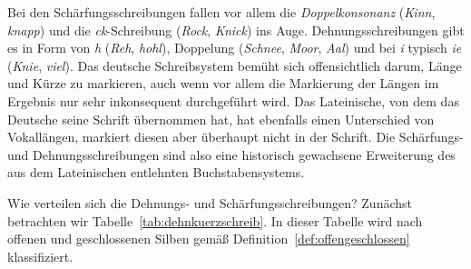 

Bei den Schärfungsschreibungen fallen vor allem die \textit{Doppelkonsonanz} (\textit{Kinn}, \textit{knapp}) und die \textit{ck}-Schreibung (\textit{Rock}, \textit{Knick}) ins Auge.
Dehnungsschreibungen gibt es in Form von \textit{h} (\textit{Reh}, \textit{hohl}), Doppelung (\textit{Schnee}, \textit{Moor}, \textit{Aal}) und bei \textit{i} typisch \textit{ie} (\textit{Knie}, \textit{viel}).
Das deutsche Schreibsystem bemüht sich offensichtlich darum, Länge und Kürze zu markieren, auch wenn vor allem die Markierung der Längen im Ergebnis nur sehr inkonsequent durchgeführt wird.
Das Lateinische, von dem das Deutsche seine Schrift übernommen hat, hat ebenfalls einen Unterschied von Vokallängen, markiert diesen aber überhaupt nicht in der Schrift.
Die Schärfungs- und Dehnungsschreibungen sind also eine historisch gewachsene Erweiterung des aus dem Lateinischen entlehnten Buchstabensystems.

Wie verteilen sich die Dehnungs- und Schärfungsschreibungen?
Zunächst betrachten wir Tabelle~\ref{tab:dehnkuerzschreib}.
In dieser Tabelle wird nach offenen und geschlossenen Silben gemäß Definition~\ref{def:offengeschlossen} klassifiziert.

\newcommand{\LocStrutGrph}{\hspace{0.1\textwidth}}

